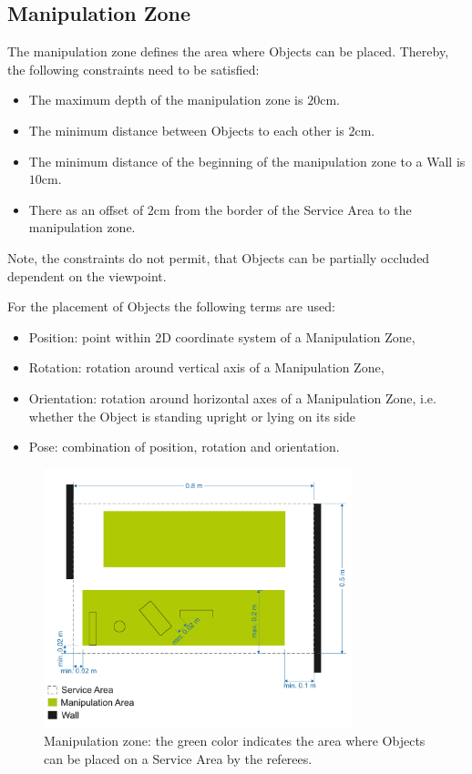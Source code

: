 \subsection{Manipulation Zone} \label{ssec:ManipulationZone}
The manipulation zone defines the area where Objects can be placed. Thereby, the following constraints need to be satisfied:
\begin{itemize}
	\item The maximum depth of the manipulation zone is $20\si{\centi\meter}$.
	\item The minimum distance between Objects to each other is $2\si{\centi\meter}$.
	\item The minimum distance of the beginning of the manipulation zone to a Wall is $10\si{\centi\meter}$.
	\item There as an offset of $2\si{\centi\meter}$ from the border of the Service Area to the manipulation zone.
\end{itemize}
Note, the constraints do not permit, that Objects can be partially occluded dependent on the viewpoint.

For the placement of Objects the following terms are used:

\begin{itemize}
	\item Position: point within 2D coordinate system of a Manipulation Zone,
	\item Rotation: rotation around vertical axis of a Manipulation Zone,
	\item Orientation: rotation around horizontal axes of a Manipulation Zone, i.e. whether the Object is standing upright or lying on its side
	\item Pose: combination of position, rotation and orientation.
\end{itemize}
\begin{figure} [h!]
\centering
\includegraphics[width=0.8\textwidth ]{./images/manipulation_zone2023.pdf}
\caption{Manipulation zone: the green color indicates the area where Objects can be placed on a Service Area by the referees.}
\label{fig:manipulation_zone}
\end{figure}

